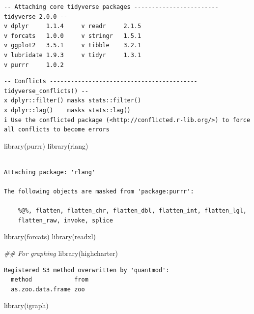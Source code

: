 \documentclass[
  letterpaper,
  DIV=11,
  numbers=noendperiod]{scrartcl}
\newenvironment{Shaded}{\begin{snugshade}}{\end{snugshade}}
\newcommand{\DocumentationTok}[1]{\textcolor[rgb]{0.37,0.37,0.37}{\textit{#1}}}
\newcommand{\FunctionTok}[1]{\textcolor[rgb]{0.28,0.35,0.67}{#1}}
\newcommand{\NormalTok}[1]{\textcolor[rgb]{0.00,0.23,0.31}{#1}}
\begin{document}
\begin{verbatim}
-- Attaching core tidyverse packages ------------------------ tidyverse 2.0.0 --
v dplyr     1.1.4     v readr     2.1.5
v forcats   1.0.0     v stringr   1.5.1
v ggplot2   3.5.1     v tibble    3.2.1
v lubridate 1.9.3     v tidyr     1.3.1
v purrr     1.0.2     
\end{verbatim}

\begin{verbatim}
-- Conflicts ------------------------------------------ tidyverse_conflicts() --
x dplyr::filter() masks stats::filter()
x dplyr::lag()    masks stats::lag()
i Use the conflicted package (<http://conflicted.r-lib.org/>) to force all conflicts to become errors
\end{verbatim}

\begin{Shaded}
\begin{Highlighting}[]
\FunctionTok{library}\NormalTok{(purrr)}
\FunctionTok{library}\NormalTok{(rlang)}
\end{Highlighting}
\end{Shaded}

\begin{verbatim}

Attaching package: 'rlang'

The following objects are masked from 'package:purrr':

    %@%, flatten, flatten_chr, flatten_dbl, flatten_int, flatten_lgl,
    flatten_raw, invoke, splice
\end{verbatim}

\begin{Shaded}
\begin{Highlighting}[]
\FunctionTok{library}\NormalTok{(forcats)}
\FunctionTok{library}\NormalTok{(readxl)}

\DocumentationTok{\#\# For graphing}
\FunctionTok{library}\NormalTok{(highcharter)}
\end{Highlighting}
\end{Shaded}

\begin{verbatim}
Registered S3 method overwritten by 'quantmod':
  method            from
  as.zoo.data.frame zoo 
\end{verbatim}

\begin{Shaded}
\begin{Highlighting}[]
\FunctionTok{library}\NormalTok{(igraph)}
\end{Highlighting}
\end{Shaded}
\end{document}
